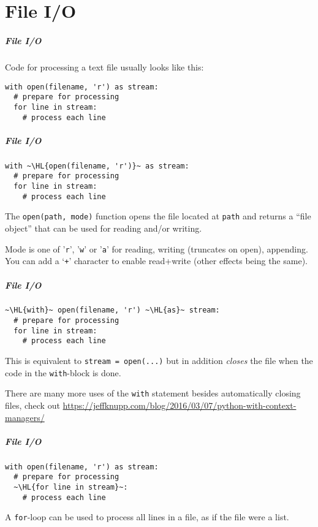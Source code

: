 \documentclass[english,serif,mathserif,xcolor=pdftex,dvipsnames,table]{beamer}
\begin{document}
\part{File I/O}

\begin{frame}[fragile]
  \frametitle{File I/O}

  Code for processing a text file usually looks like this:
\begin{lstlisting}
with open(filename, 'r') as stream:
  # prepare for processing
  for line in stream:
    # process each line
\end{lstlisting}
\end{frame}


\begin{frame}[fragile]
  \frametitle{File I/O}

\begin{lstlisting}
with ~\HL{open(filename, 'r')}~ as stream:
  # prepare for processing
  for line in stream:
    # process each line
\end{lstlisting}

  \+ The \lstinline|open(path, mode)| function opens the file located at
  \texttt{path} and returns a ``file object'' that can be used for reading
  and/or writing.

  \+ Mode is one of '\texttt{r}', '\texttt{w}' or '\texttt{a}' for reading,
  writing (truncates on open), appending. You can add a `\texttt{+}' character
  to enable read+write (other effects being the same).
\end{frame}


\begin{frame}[fragile]
  \frametitle{File I/O}

\begin{lstlisting}
~\HL{with}~ open(filename, 'r') ~\HL{as}~ stream:
  # prepare for processing
  for line in stream:
    # process each line
\end{lstlisting}

  \+
  This is equivalent to \lstinline|stream = open(...)| but in addition
  \emph{closes} the file when the code in the \texttt{with}-block is done.

  \+
  There are many more uses of the \texttt{with} statement besides automatically
  closing files, check out \url{https://jeffknupp.com/blog/2016/03/07/python-with-context-managers/}
\end{frame}


\begin{frame}[fragile]
  \frametitle{File I/O}

\begin{lstlisting}
with open(filename, 'r') as stream:
  # prepare for processing
  ~\HL{for line in stream}~:
    # process each line
\end{lstlisting}

  \+ A \texttt{for}-loop can be used to process all lines in a file, as if the
  file were a list.
\end{frame}
\end{document}
